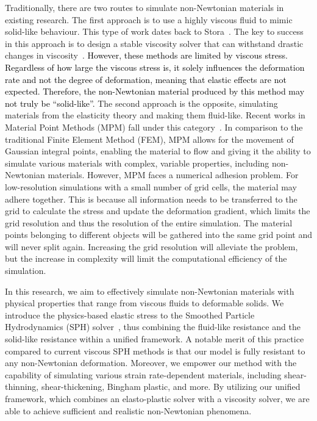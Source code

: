\documentclass[10pt,journal,compsoc]{IEEEtran}
\newcommand{\revised}[1]{{\textcolor{black}{#1}}}
\begin{document}
Traditionally, there are two routes to simulate non-Newtonian materials in existing research. The first approach is to use a highly viscous fluid to mimic solid-like behaviour. This type of work dates back to Stora~\cite{Stora1999}. The key to success in this approach is to design a stable viscosity solver that can withstand drastic changes in viscosity~\cite{Peer2015,Goldade2019-Adaptive-Octree-Viscosity}. \revised{However, these methods are limited by viscous stress. Regardless of how large the viscous stress is, it solely influences the deformation rate and not the degree of deformation, meaning that elastic effects are not expected.
Therefore, the non-Newtonian material produced by this method may not truly be “solid-like”.} The second approach is the opposite, simulating materials from the elasticity theory and making them fluid-like. Recent works in Material Point Methods (MPM) fall under this category~\cite{Stomakhin2014,Su2021}. In comparison to the traditional Finite Element Method (FEM), MPM allows for the movement of Gaussian integral points, enabling the material to flow and giving it the ability to simulate various materials with complex, variable properties, including non-Newtonian materials. However, MPM faces a numerical adhesion problem. For low-resolution simulations with a small number of grid cells, the material may adhere together. This is because all information needs to be transferred to the grid to calculate the stress and update the deformation gradient, which limits the grid resolution and thus the resolution of the entire simulation. The material points belonging to different objects will be gathered into the same grid point and will never split again. Increasing the grid resolution will alleviate the problem, but the increase in complexity will limit the computational efficiency of the simulation.

In this research, we aim to effectively simulate non-Newtonian materials with physical properties that range from viscous fluids to deformable solids. We introduce the physics-based elastic stress to the Smoothed Particle Hydrodynamics (SPH) solver~\cite{koschier2022survey}, thus combining the fluid-like resistance and the solid-like resistance within a unified framework. A notable merit of this practice compared to current viscous SPH methods is that our model is fully resistant to any non-Newtonian deformation. Moreover, we empower our method with the capability of simulating various strain rate-dependent materials, including shear-thinning, shear-thickening, Bingham plastic, and more. By utilizing our unified framework, which combines an elasto-plastic solver with a viscosity solver, we are able to achieve sufficient and realistic non-Newtonian phenomena.
\end{document}
